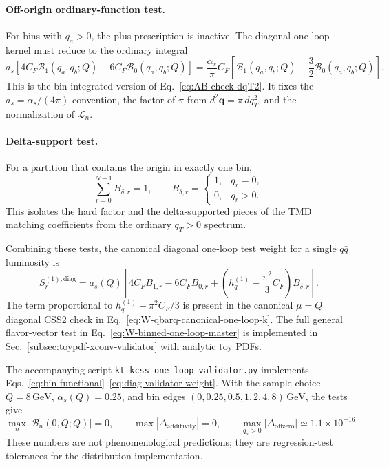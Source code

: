 \documentclass[11pt]{article}
\newcommand{\bq}{\bm{q}}
\begin{document}
\paragraph{Off-origin ordinary-function test.}
For bins with $q_a>0$, the plus prescription is inactive.  The diagonal one-loop kernel
must reduce to the ordinary integral
\begin{equation}
  a_s\left[4C_F\mathcal B_1(q_a,q_b;Q)-6C_F\mathcal B_0(q_a,q_b;Q)\right]
  =
  \frac{\alpha_s}{\pi}C_F
  \left[
    \mathcal B_1(q_a,q_b;Q)-\frac{3}{2}\mathcal B_0(q_a,q_b;Q)
  \right].
  \label{eq:off-origin-bin-test}
\end{equation}
This is the bin-integrated version of Eq.~\eqref{eq:AB-check-dqT2}. It fixes the
$a_s=\alpha_s/(4\pi)$ convention, the factor of $\pi$ from
$d^2\bq=\pi\,dq_T^2$, and the normalization of $\mathcal L_n$.

\paragraph{Delta-support test.}
For a partition that contains the origin in exactly one bin,
\begin{equation}
  \sum_{r=0}^{N-1}B_{\delta,r}=1,
  \qquad
  B_{\delta,r}=\begin{cases}
    1,&q_r=0,\\
    0,&q_r>0.
  \end{cases}
  \label{eq:delta-support-test}
\end{equation}
This isolates the hard factor and the delta-supported pieces of the TMD matching
coefficients from the ordinary $q_T>0$ spectrum.

Combining these tests, the canonical diagonal one-loop test weight for a single
$q\bar q$ luminosity is
\begin{equation}
  S^{(1),\mathrm{diag}}_r
  =
  a_s(Q)
  \left[
    4C_F B_{1,r}-6C_F B_{0,r}
    +\left(h_q^{(1)}-\frac{\pi^2}{3}C_F\right)B_{\delta,r}
  \right].
  \label{eq:diag-validator-weight}
\end{equation}
The term proportional to $h_q^{(1)}-\pi^2 C_F/3$ is present in the canonical
$\mu=Q$ diagonal CSS2 check in Eq.~\eqref{eq:W-qbarq-canonical-one-loop-k}.  The full
general flavor-vector test in Eq.~\eqref{eq:W-binned-one-loop-master} is implemented in
Sec.~\ref{subsec:toypdf-xconv-validator} with analytic toy PDFs.

The accompanying script \texttt{kt\_kcss\_one\_loop\_validator.py} implements
Eqs.~\eqref{eq:bin-functional}--\eqref{eq:diag-validator-weight}.  With the sample choice
$Q=8\,\mathrm{GeV}$, $\alpha_s(Q)=0.25$, and bin edges
$(0,0.25,0.5,1,2,4,8)\,\mathrm{GeV}$, the tests give
\begin{equation}
  \max_n\left|\mathcal B_n(0,Q;Q)\right|=0,
  \qquad
  \max\left|\Delta_{\mathrm{additivity}}\right|=0,
  \qquad
  \max_{q_a>0}\left|\Delta_{\mathrm{offzero}}\right|\simeq 1.1\times10^{-16}.
  \label{eq:sample-validator-output}
\end{equation}
These numbers are not phenomenological predictions; they are regression-test tolerances
for the distribution implementation.
\end{document}
